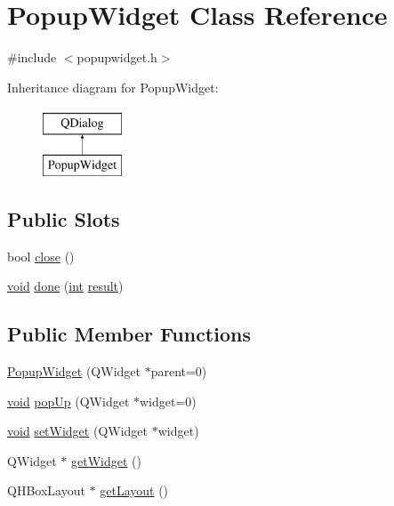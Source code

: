 \hypertarget{class_popup_widget}{\section{Popup\-Widget Class Reference}
\label{class_popup_widget}
}


{\ttfamily \#include $<$popupwidget.\-h$>$}

Inheritance diagram for Popup\-Widget\-:\begin{figure}[H]
\begin{center}
\leavevmode
\includegraphics[height=2.000000cm]{class_popup_widget}
\end{center}
\end{figure}
\subsection*{Public Slots}
\begin{DoxyCompactItemize}
\item 
bool \hyperlink{class_popup_widget_a9c5e3e0474a1a827babe0c8169cb429f}{close} ()
\item 
\hyperlink{group___u_a_v_objects_plugin_ga444cf2ff3f0ecbe028adce838d373f5c}{void} \hyperlink{class_popup_widget_a36603e041ee92cc5440f1f9147b5ed2c}{done} (\hyperlink{ioapi_8h_a787fa3cf048117ba7123753c1e74fcd6}{int} \hyperlink{qxtslotjob_8h_aab161efab0511ea9612b64c40e9852ca}{result})
\end{DoxyCompactItemize}
\subsection*{Public Member Functions}
\begin{DoxyCompactItemize}
\item 
\hyperlink{class_popup_widget_a65bffb57db36284b740a658485c68798}{Popup\-Widget} (Q\-Widget $\ast$parent=0)
\item 
\hyperlink{group___u_a_v_objects_plugin_ga444cf2ff3f0ecbe028adce838d373f5c}{void} \hyperlink{class_popup_widget_a7fa5f95babcb7743b3dd2e5acee81360}{pop\-Up} (Q\-Widget $\ast$widget=0)
\item 
\hyperlink{group___u_a_v_objects_plugin_ga444cf2ff3f0ecbe028adce838d373f5c}{void} \hyperlink{class_popup_widget_a173835e7564514126a61eeedd7c202fc}{set\-Widget} (Q\-Widget $\ast$widget)
\item 
Q\-Widget $\ast$ \hyperlink{class_popup_widget_a4ea4121adae94efb898dcd8a37cc5db6}{get\-Widget} ()
\item 
Q\-H\-Box\-Layout $\ast$ \hyperlink{class_popup_widget_a66c5a451e2226eeb838c18b8b394751b}{get\-Layout} ()
\end{DoxyCompactItemize}


